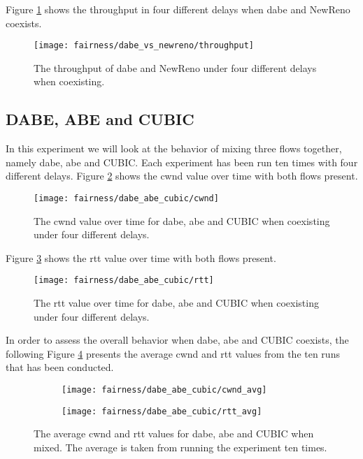 Figure \ref{fig:dabe_and_newreno_throughput} shows the throughput in four different delays when \gls{dabe} and NewReno coexists.

\begin{figure}[H]
    \centering
    \texttt{[image: fairness/dabe\_vs\_newreno/throughput]}
    \captionsetup{width=1.0\linewidth}
    \caption{The throughput of \gls{dabe} and NewReno under four different delays when coexisting.}
    \label{fig:dabe_and_newreno_throughput}
\end{figure}


\subsection{DABE, ABE and CUBIC}

In this experiment we will look at the behavior of mixing three flows together, namely \gls{dabe}, \gls{abe} and CUBIC. Each experiment has been run ten times with four different delays. Figure \ref{fig:dabe_abe_cubic_cwnd} shows the \gls{cwnd} value over time with both flows present.

\begin{figure}[H]
    \centering
    \texttt{[image: fairness/dabe\_abe\_cubic/cwnd]}
    \captionsetup{width=1.0\linewidth}
    \caption{The \gls{cwnd} value over time for \gls{dabe}, \gls{abe} and CUBIC when coexisting under four different delays.}
    \label{fig:dabe_abe_cubic_cwnd}
\end{figure}

Figure \ref{fig:dabe_abe_cubic_rtt} shows the \gls{rtt} value over time with both flows present.

\begin{figure}[H]
    \centering
    \texttt{[image: fairness/dabe\_abe\_cubic/rtt]}
    \captionsetup{width=1.0\linewidth}
    \caption{The \gls{rtt} value over time for \gls{dabe}, \gls{abe} and CUBIC when coexisting under four different delays.}
    \label{fig:dabe_abe_cubic_rtt}
\end{figure}

In order to assess the overall behavior when \gls{dabe}, \gls{abe} and CUBIC coexists, the following Figure \ref{fig:dabe_abe_cubic_avg} presents the average \gls{cwnd} and \gls{rtt} values from the ten runs that has been conducted.

\begin{figure}[H]
    \centering
    \begin{subfigure}{0.5\linewidth}
        \centering
        \texttt{[image: fairness/dabe\_abe\_cubic/cwnd\_avg]}
    \end{subfigure}%
    \begin{subfigure}{0.5\linewidth}
        \centering
        \texttt{[image: fairness/dabe\_abe\_cubic/rtt\_avg]}
    \end{subfigure}
    \caption{The average \gls{cwnd} and \gls{rtt} values for \gls{dabe}, \gls{abe} and CUBIC when mixed. The average is taken from running the experiment ten times.}
    \label{fig:dabe_abe_cubic_avg}
\end{figure}

